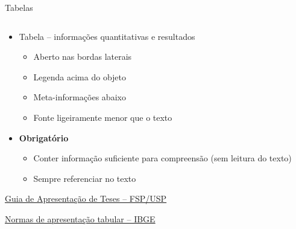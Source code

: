 \documentclass{beamer}
\begin{document}
\begin{frame}{\scriptsize Tabelas}
  \begin{columns}
    \begin{column}{.5\textwidth}
  \begin{itemize}
    \scriptsize
  \item Tabela -- informações quantitativas e resultados
    \begin{itemize}
      \tiny
    \item Aberto nas bordas laterais
    \item Legenda acima do objeto
    \item Meta-informações abaixo
    \item Fonte ligeiramente menor que o texto
    \end{itemize}
    \bigskip
  \item \alert{\bf Obrigatório}
    \begin{itemize}
      \tiny
    \item Conter informação suficiente para compreensão ({\tiny sem leitura do texto})
    \item Sempre referenciar no texto
    \end{itemize}
  \end{itemize}
      \bigskip
      \bigskip
      \tiny
      \hfill \href{http://www.biblioteca.fsp.usp.br/~biblioteca/guia/i_cap_04.htm}
      {Guia de Apresentação de Teses -- FSP/USP}

      \hfill \href{https://biblioteca.ibge.gov.br/index.php/biblioteca-catalogo?view=detalhes&id=223907}
      {Normas de apresentação tabular -- IBGE}
    \end{column}
    \begin{column}{.5\textwidth}
    \end{column}
  \end{columns}
\end{frame}
\end{document}
